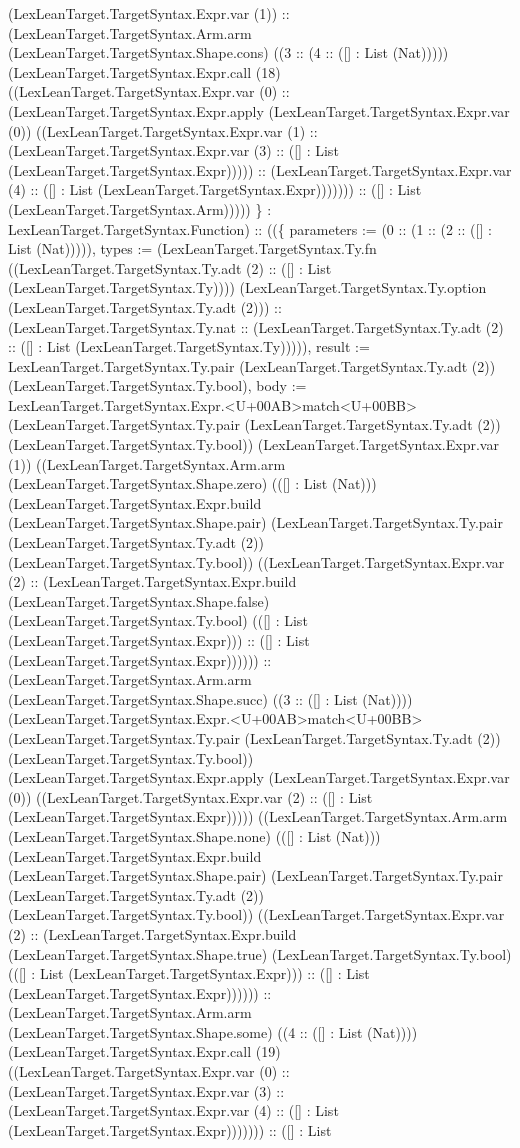\documentclass[11pt]{article}
\begin{document}
(LexLeanTarget.TargetSyntax.Expr.var (1)) :: (LexLeanTarget.TargetSyntax.Arm.arm (LexLeanTarget.TargetSyntax.Shape.cons) ((3 :: (4 :: ([] : List (Nat))))) (LexLeanTarget.TargetSyntax.Expr.call (18) ((LexLeanTarget.TargetSyntax.Expr.var (0) :: (LexLeanTarget.TargetSyntax.Expr.apply (LexLeanTarget.TargetSyntax.Expr.var (0)) ((LexLeanTarget.TargetSyntax.Expr.var (1) :: (LexLeanTarget.TargetSyntax.Expr.var (3) :: ([] : List (LexLeanTarget.TargetSyntax.Expr))))) :: (LexLeanTarget.TargetSyntax.Expr.var (4) :: ([] : List (LexLeanTarget.TargetSyntax.Expr))))))) :: ([] : List (LexLeanTarget.TargetSyntax.Arm))))) \} : LexLeanTarget.TargetSyntax.Function) :: ((\{ parameters := (0 :: (1 :: (2 :: ([] : List (Nat))))), types := (LexLeanTarget.TargetSyntax.Ty.fn ((LexLeanTarget.TargetSyntax.Ty.adt (2) :: ([] : List (LexLeanTarget.TargetSyntax.Ty)))) (LexLeanTarget.TargetSyntax.Ty.option (LexLeanTarget.TargetSyntax.Ty.adt (2))) :: (LexLeanTarget.TargetSyntax.Ty.nat :: (LexLeanTarget.TargetSyntax.Ty.adt (2) :: ([] : List (LexLeanTarget.TargetSyntax.Ty))))), result := LexLeanTarget.TargetSyntax.Ty.pair (LexLeanTarget.TargetSyntax.Ty.adt (2)) (LexLeanTarget.TargetSyntax.Ty.bool), body := LexLeanTarget.TargetSyntax.Expr.<U+00AB>match<U+00BB> (LexLeanTarget.TargetSyntax.Ty.pair (LexLeanTarget.TargetSyntax.Ty.adt (2)) (LexLeanTarget.TargetSyntax.Ty.bool)) (LexLeanTarget.TargetSyntax.Expr.var (1)) ((LexLeanTarget.TargetSyntax.Arm.arm (LexLeanTarget.TargetSyntax.Shape.zero) (([] : List (Nat))) (LexLeanTarget.TargetSyntax.Expr.build (LexLeanTarget.TargetSyntax.Shape.pair) (LexLeanTarget.TargetSyntax.Ty.pair (LexLeanTarget.TargetSyntax.Ty.adt (2)) (LexLeanTarget.TargetSyntax.Ty.bool)) ((LexLeanTarget.TargetSyntax.Expr.var (2) :: (LexLeanTarget.TargetSyntax.Expr.build (LexLeanTarget.TargetSyntax.Shape.false) (LexLeanTarget.TargetSyntax.Ty.bool) (([] : List (LexLeanTarget.TargetSyntax.Expr))) :: ([] : List (LexLeanTarget.TargetSyntax.Expr)))))) :: (LexLeanTarget.TargetSyntax.Arm.arm (LexLeanTarget.TargetSyntax.Shape.succ) ((3 :: ([] : List (Nat)))) (LexLeanTarget.TargetSyntax.Expr.<U+00AB>match<U+00BB> (LexLeanTarget.TargetSyntax.Ty.pair (LexLeanTarget.TargetSyntax.Ty.adt (2)) (LexLeanTarget.TargetSyntax.Ty.bool)) (LexLeanTarget.TargetSyntax.Expr.apply (LexLeanTarget.TargetSyntax.Expr.var (0)) ((LexLeanTarget.TargetSyntax.Expr.var (2) :: ([] : List (LexLeanTarget.TargetSyntax.Expr))))) ((LexLeanTarget.TargetSyntax.Arm.arm (LexLeanTarget.TargetSyntax.Shape.none) (([] : List (Nat))) (LexLeanTarget.TargetSyntax.Expr.build (LexLeanTarget.TargetSyntax.Shape.pair) (LexLeanTarget.TargetSyntax.Ty.pair (LexLeanTarget.TargetSyntax.Ty.adt (2)) (LexLeanTarget.TargetSyntax.Ty.bool)) ((LexLeanTarget.TargetSyntax.Expr.var (2) :: (LexLeanTarget.TargetSyntax.Expr.build (LexLeanTarget.TargetSyntax.Shape.true) (LexLeanTarget.TargetSyntax.Ty.bool) (([] : List (LexLeanTarget.TargetSyntax.Expr))) :: ([] : List (LexLeanTarget.TargetSyntax.Expr)))))) :: (LexLeanTarget.TargetSyntax.Arm.arm (LexLeanTarget.TargetSyntax.Shape.some) ((4 :: ([] : List (Nat)))) (LexLeanTarget.TargetSyntax.Expr.call (19) ((LexLeanTarget.TargetSyntax.Expr.var (0) :: (LexLeanTarget.TargetSyntax.Expr.var (3) :: (LexLeanTarget.TargetSyntax.Expr.var (4) :: ([] : List (LexLeanTarget.TargetSyntax.Expr))))))) :: ([] : List 
\end{document}
